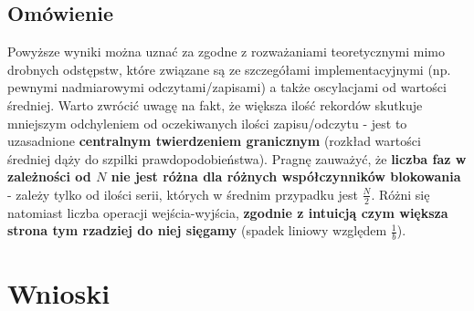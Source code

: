 \documentclass{article}
\begin{document}
\subsection{Omówienie}
Powyższe wyniki można uznać za zgodne z rozważaniami teoretycznymi mimo drobnych odstępstw, które
związane są ze szczegółami implementacyjnymi (np. pewnymi nadmiarowymi odczytami/zapisami) a także 
oscylacjami od wartości średniej. Warto zwrócić uwagę na fakt, że większa ilość rekordów skutkuje mniejszym
odchyleniem od oczekiwanych ilości zapisu/odczytu - jest to uzasadnione \textbf{centralnym twierdzeniem granicznym}
(rozkład wartości średniej dąży do szpilki prawdopodobieństwa). Pragnę zauważyć, że \textbf{liczba faz w zależności od 
$N$ nie jest różna dla różnych współczynników blokowania} - zależy tylko od ilości serii, których w średnim przypadku jest $\frac{N}{2}$. Różni się natomiast liczba operacji wejścia-wyjścia, \textbf{zgodnie z intuicją czym większa
strona tym rzadziej do niej sięgamy} (spadek liniowy względem $\frac{1}{b}$).
\section{Wnioski}
\end{document}
